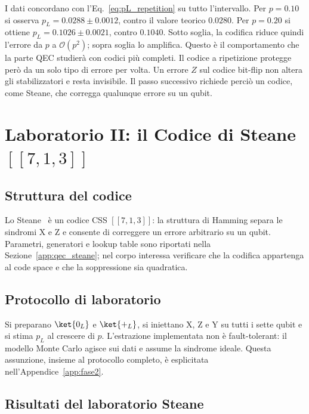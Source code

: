 \begin{onehalfspace}
I dati concordano con l'Eq.~\ref{eq:pL_repetition} su tutto l'intervallo. Per $p = 0.10$ si osserva $p_L = 0.0288 \pm 0.0012$, contro il valore teorico $0.0280$. Per $p = 0.20$ si ottiene $p_L = 0.1026 \pm 0.0021$, contro $0.1040$. Sotto soglia, la codifica riduce quindi l'errore da $p$ a $\mathcal{O}(p^2)$; sopra soglia lo amplifica. Questo è il comportamento che la parte \ac{QEC} studierà con codici più completi. Il codice a ripetizione protegge però da un solo tipo di errore per volta. Un errore $Z$ sul codice bit-flip non altera gli stabilizzatori e resta invisibile. Il passo successivo richiede perciò un codice, come Steane, che corregga qualunque errore su un qubit.

\section{Laboratorio II: il Codice di Steane
\texorpdfstring{$[[7,1,3]]$}{[[7,1,3]]}}
\label{sec:steane}

\subsection{Struttura del codice}

Lo Steane~\cite{steane1996} è un codice \ac{CSS} $[[7,1,3]]$: la
struttura di Hamming separa le sindromi X e Z e consente di correggere un
errore arbitrario su un qubit. Parametri, generatori e lookup table sono
riportati nella Sezione~\ref{app:qec_steane}; nel corpo interessa
verificare che la codifica appartenga al code space e che la soppressione
sia quadratica.

\subsection{Protocollo di laboratorio}

Si preparano $\ket{0_L}$ e $\ket{+_L}$, si iniettano X, Z e Y su tutti i
sette qubit e si stima $p_L$ al crescere di $p$. L'estrazione implementata
non è fault-tolerant: il modello Monte Carlo agisce sui dati e assume la
sindrome ideale. Questa assunzione, insieme al protocollo completo, è
esplicitata nell'Appendice~\ref{app:fase2}.

\subsection{Risultati del laboratorio Steane}
\label{subsec:risultati_steane}


\end{onehalfspace}
